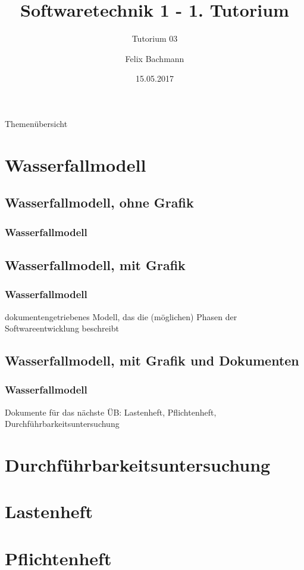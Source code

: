 \documentclass[18pt]{beamer}
\title[SWT1]{Softwaretechnik 1 - 1. Tutorium}
\subtitle{Tutorium 03}
\author{Felix Bachmann}
\date{15.05.2017}
\institute{KIT - Institut für Programmstrukturen und Datenorganisation (IPD)}
\begin{document}

\begin{frame}
\titlepage
\end{frame}

\begin{frame}{Themenübersicht}
\tableofcontents
\end{frame}
	
\section{Wasserfallmodell}
	\subsection{Wasserfallmodell, ohne Grafik}
	\begin{frame}
		\frametitle{Wasserfallmodell}
	\end{frame}
	
	\subsection{Wasserfallmodell, mit Grafik}
	\begin{frame}
		\frametitle{Wasserfallmodell}
		dokumentengetriebenes Modell, das die (möglichen) Phasen der Softwareentwicklung beschreibt
	\end{frame}
	
	\subsection{Wasserfallmodell, mit Grafik und Dokumenten}
	\begin{frame}
		\frametitle{Wasserfallmodell}
		Dokumente für das nächste ÜB: Lastenheft, Pflichtenheft, Durchführbarkeitsuntersuchung
	\end{frame}

\section{Durchführbarkeitsuntersuchung}

\section{Lastenheft}

\section{Pflichtenheft}
\end{document}
